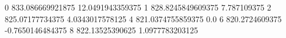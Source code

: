 0 833.086669921875 12.0491943359375
1 828.8245849609375 7.787109375
2 825.07177734375 4.0343017578125
4 821.0374755859375 0.0
6 820.2724609375 -0.7650146484375
8 822.13525390625 1.0977783203125
